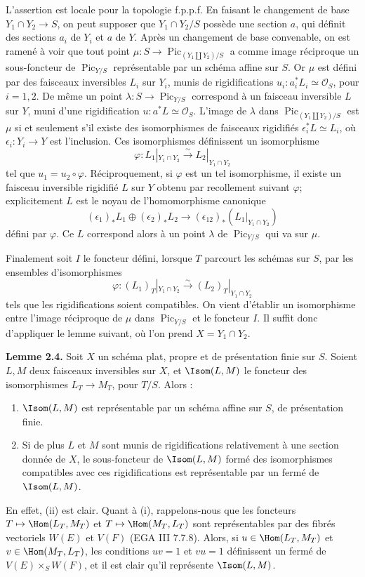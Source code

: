 \documentclass[11pt]{article}
\providecommand{\Pic}{\operatorname{Pic}}
\begin{document}
L'assertion est locale pour la topologie f.p.p.f. En faisant le changement de base \(Y_1\cap Y_2\to S\), on peut supposer que \(Y_1\cap Y_2/S\) possède une section \(a\), qui définit des sections \(a_i\) de \(Y_i\) et \(a\) de \(Y\). Après un changement de base convenable, on est ramené à voir que tout point \(\mu:S\to\Pic_{(Y_1\amalg Y_2)/S}\) a comme image réciproque un sous-foncteur de \(\Pic_{Y/S}\) représentable par un schéma affine sur \(S\). Or \(\mu\) est défini par des faisceaux inversibles \(L_i\) sur \(Y_i\), munis de rigidifications \(u_i:a_i^*L_i\simeq\mathcal O_S\), pour \(i=1,2\). De même un point \(\lambda:S\to\Pic_{Y/S}\) correspond à un faisceau inversible \(L\) sur \(Y\), muni d'une rigidification \(u:a^*L\simeq\mathcal O_S\). L'image de \(\lambda\) dans \(\Pic_{(Y_1\amalg Y_2)/S}\) est \(\mu\) si et seulement s'il existe des isomorphismes de faisceaux rigidifiés \(\epsilon_i^*L\simeq L_i\), où \(\epsilon_i:Y_i\to Y\) est l'inclusion. Ces isomorphismes définissent un isomorphisme
\[
  \varphi:L_1|_{Y_1\cap Y_2}\xrightarrow{\sim}L_2|_{Y_1\cap Y_2}
\]
tel que \(u_1=u_2\circ\varphi\). Réciproquement, si \(\varphi\) est un tel isomorphisme, il existe un faisceau inversible rigidifié \(L\) sur \(Y\) obtenu par recollement suivant \(\varphi\); explicitement \(L\) est le noyau de l'homomorphisme canonique
\[
  (\epsilon_1)_*L_1\oplus(\epsilon_2)_*L_2
  \longrightarrow
  (\epsilon_{12})_*(L_1|_{Y_1\cap Y_2})
\]
défini par \(\varphi\). Ce \(L\) correspond alors à un point \(\lambda\) de \(\Pic_{Y/S}\) qui va sur \(\mu\).

Finalement soit \(I\) le foncteur défini, lorsque \(T\) parcourt les schémas sur \(S\), par les ensembles d'isomorphismes
\[
  \varphi:(L_1)_T|_{Y_1\cap Y_2}\xrightarrow{\sim}(L_2)_T|_{Y_1\cap Y_2}
\]
tels que les rigidifications soient compatibles. On vient d'établir un isomorphisme entre l'image réciproque de \(\mu\) dans \(\Pic_{Y/S}\) et le foncteur \(I\). Il suffit donc d'appliquer le lemme suivant, où l'on prend \(X=Y_1\cap Y_2\).

\textbf{Lemme 2.4.} Soit \(X\) un schéma plat, propre et de présentation finie sur \(S\). Soient \(L,M\) deux faisceaux inversibles sur \(X\), et \(\Isom(L,M)\) le foncteur des isomorphismes \(L_T\to M_T\), pour \(T/S\). Alors :
\begin{enumerate}[label=\roman*)]
\item \(\Isom(L,M)\) est représentable par un schéma affine sur \(S\), de présentation finie.
\item Si de plus \(L\) et \(M\) sont munis de rigidifications relativement à une section donnée de \(X\), le sous-foncteur de \(\Isom(L,M)\) formé des isomorphismes compatibles avec ces rigidifications est représentable par un fermé de \(\Isom(L,M)\).
\end{enumerate}
En effet, (ii) est clair. Quant à (i), rappelons-nous que les foncteurs \(T\mapsto\Hom(L_T,M_T)\) et \(T\mapsto\Hom(M_T,L_T)\) sont représentables par des fibrés vectoriels \(W(E)\) et \(V(F)\) (EGA III 7.7.8). Alors, si \(u\in\Hom(L_T,M_T)\) et \(v\in\Hom(M_T,L_T)\), les conditions \(uv=1\) et \(vu=1\) définissent un fermé de \(V(E)\times_SW(F)\), et il est clair qu'il représente \(\Isom(L,M)\).
\end{document}
